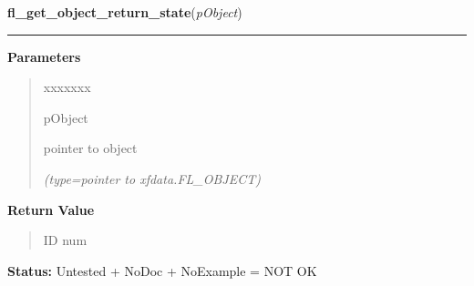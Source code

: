     \label{xformslib:library:fl_get_object_return_state}

    \vspace{0.5ex}

\hspace{.8\funcindent}\begin{boxedminipage}{\funcwidth}

    \raggedright \textbf{fl\_get\_object\_return\_state}(\textit{pObject})

    \vspace{-1.5ex}

    \rule{\textwidth}{0.5\fboxrule}
\setlength{\parskip}{2ex}
\setlength{\parskip}{1ex}
      \textbf{Parameters}
      \vspace{-1ex}

      \begin{quote}
        \begin{Ventry}{xxxxxxx}

          \item[pObject]

          pointer to object

            {\it (type=pointer to xfdata.FL\_OBJECT)}

        \end{Ventry}

      \end{quote}

      \textbf{Return Value}
    \vspace{-1ex}

      \begin{quote}
      ID num

      \end{quote}

\textbf{Status:} Untested + NoDoc + NoExample = NOT OK



    \end{boxedminipage}

    \label{xformslib:library:fl_trigger_object}

    \vspace{0.5ex}

